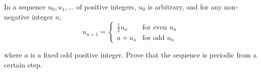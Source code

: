 In a sequence $u_0,u_1,\ldots $ of positive integers, $u_0$ is arbitrary, and for any non-negative integer $n$, \[ u_{n+1}=\begin{cases}\frac{1}{2}u_n & \text{for even }u_n \\ a+u_n & \text{for odd }u_n \end{cases} \]

where $a$ is a fixed odd positive integer. Prove that the sequence is periodic from a certain step.